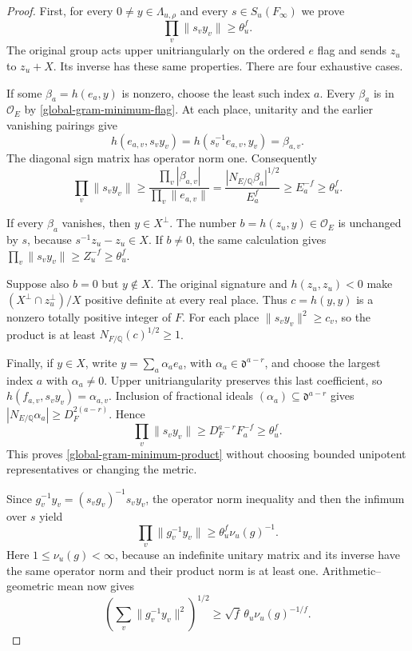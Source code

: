 \begin{proof}
First, for every $0\ne y\in\Lambda_{u,\rho}$ and every
$s\in S_u(F_\infty)$ we prove
\begin{equation}\label{global-gram-minimum-product}
                  \prod_v\|s_vy_v\|\ge\theta_u^f.
\end{equation}
The original group acts upper unitriangularly on the ordered
$e$ flag and sends $z_u$ to $z_u+X$.  Its inverse has these
same properties.  There are four exhaustive cases.

If some $\beta_a=h(e_a,y)$ is nonzero, choose the least such
index $a$.  Every $\beta_a$ is in $\mathcal O_E$ by
\eqref{global-gram-minimum-flag}.  At each place, unitarity and
the earlier vanishing pairings give
\[
 h(e_{a,v},s_vy_v)=h(s_v^{-1}e_{a,v},y_v)=\beta_{a,v}.
\]
The diagonal sign matrix has operator norm one.  Consequently
\[
 \prod_v\|s_vy_v\|\ge
   \frac{\prod_v|\beta_{a,v}|}{\prod_v\|e_{a,v}\|}
 =\frac{|N_{E/\mathbb Q}\beta_a|^{1/2}}{E_a^f}
 \ge E_a^{-f}\ge\theta_u^f.
\]

If every $\beta_a$ vanishes, then $y\in X^\perp$.  The number
$b=h(z_u,y)\in\mathcal O_E$ is unchanged by $s$, because
$s^{-1}z_u-z_u\in X$.  If $b\ne0$, the same calculation gives
$\prod_v\|s_vy_v\|\ge Z_u^{-f}\ge\theta_u^f$.

Suppose also $b=0$ but $y\notin X$.  The original signature
and $h(z_u,z_u)<0$ make
$(X^\perp\cap z_u^\perp)/X$ positive definite at every real place.
Thus $c=h(y,y)$ is a nonzero totally positive integer of $F$.
For each place $\|s_vy_v\|^2\ge c_v$, so the product is at
least $N_{F/\mathbb Q}(c)^{1/2}\ge1$.

Finally, if $y\in X$, write $y=\sum_a\alpha_ae_a$, with
$\alpha_a\in\mathfrak d^{a-r}$, and choose the largest index
$a$ with $\alpha_a\ne0$.  Upper unitriangularity preserves this
last coefficient, so $h(f_{a,v},s_vy_v)=\alpha_{a,v}$.
Inclusion of fractional ideals $(\alpha_a)\subseteq\mathfrak d^{a-r}$
gives $|N_{E/\mathbb Q}\alpha_a|\ge D_F^{2(a-r)}$.  Hence
\[
 \prod_v\|s_vy_v\|\ge D_F^{a-r}F_a^{-f}\ge\theta_u^f.
\]
This proves \eqref{global-gram-minimum-product} without choosing
bounded unipotent representatives or changing the metric.

Since $g_v^{-1}y_v=(s_vg_v)^{-1}s_vy_v$, the operator norm
inequality and then the infimum over $s$ yield
\[
 \prod_v\|g_v^{-1}y_v\|\ge\theta_u^f\nu_u(g)^{-1}.
\]
Here $1\le\nu_u(g)<\infty$, because an indefinite unitary matrix
and its inverse have the same operator norm and their product
norm is at least one.  Arithmetic--geometric mean now gives
\begin{equation}\label{global-gram-minimum-shortest}
 \left(\sum_v\|g_v^{-1}y_v\|^2\right)^{1/2}
                 \ge\sqrt f\,\theta_u\nu_u(g)^{-1/f}.
\end{equation}


\end{proof}
